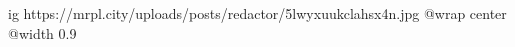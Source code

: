  
 
 
 
 

\ifcmt
  ig https://mrpl.city/uploads/posts/redactor/5lwyxuukclahsx4n.jpg
  @wrap center
  @width 0.9
\fi
